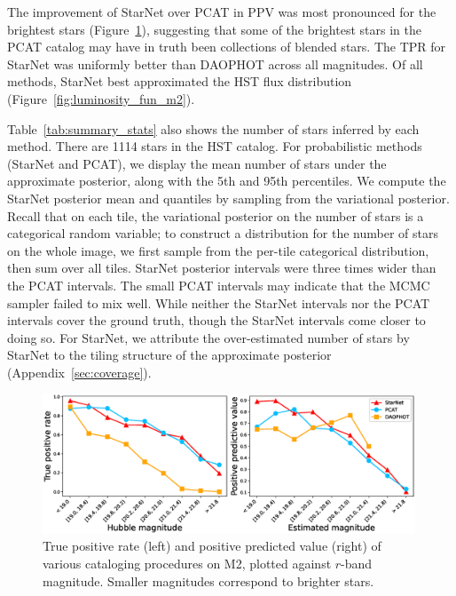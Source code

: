 The improvement of StarNet over PCAT in PPV was most pronounced for the brightest stars (Figure~\ref{fig:summary_stats}), 
suggesting that some of the brightest stars in the PCAT catalog may have in truth been collections of blended stars. 
The TPR for StarNet was uniformly better than DAOPHOT across all magnitudes.
Of all methods, StarNet best approximated the HST flux distribution (Figure~\ref{fig:luminosity_fun_m2}).

Table~\ref{tab:summary_stats} also shows the number of stars inferred by each method.
There are 1114 stars in the HST catalog.
For probabilistic methods (StarNet and PCAT),
we display the mean number of stars under the approximate posterior, along with the 5th and 95th percentiles.
We compute the StarNet posterior mean and quantiles by sampling from the variational posterior. 
Recall that on each tile, the variational posterior on the number of stars is a categorical random variable; 
to construct a distribution for the number of stars on the whole image, we first sample from the per-tile categorical distribution, then sum over all tiles. 
StarNet posterior intervals were three times wider than the PCAT intervals.
The small PCAT intervals may indicate that the MCMC sampler failed to mix well. 
While neither the StarNet intervals nor the PCAT intervals cover the ground truth, though the StarNet intervals come closer to doing so. 
For StarNet, we attribute the over-estimated number of stars by StarNet to the tiling structure of 
the approximate posterior (Appendix~\ref{sec:coverage}). 





\begin{figure}[tb]
    \centering
    \includegraphics[width=0.99\textwidth]{figures_vg/m2_results/summary_statistics_m2.eps}
    \caption{True positive rate (left) and positive predicted value (right) of various cataloging
    procedures on M2, plotted against $r$-band magnitude.
    Smaller magnitudes correspond to brighter stars.
    }
    \label{fig:summary_stats}
\end{figure}

